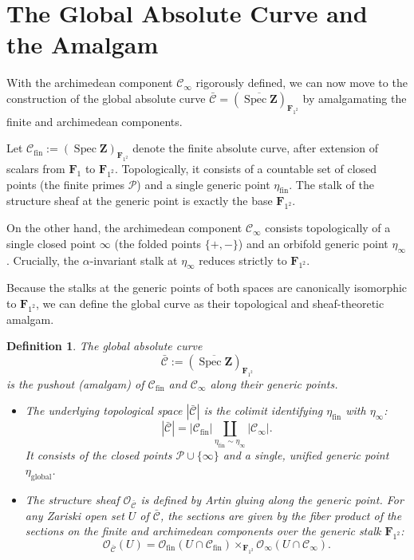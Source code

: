 \documentclass[11pt,a4paper]{article}
\let\mathscr\mathscr
\newtheorem{definition}[theorem]{Definition}
\newcommand{\Z}{\mathbf{Z}}
\newcommand{\Fone}{\mathbf{F}_{1}}
\newcommand{\Ftwo}{\mathbf{F}_{1^2}}
\def\spzb{\overline{\Spec \Z}}
\newcommand{\minf}{\mathscr C_\infty}
\newcommand{\Spec}{\operatorname{Spec}}
\begin{document}
\section{The Global Absolute Curve and the Amalgam}\label{sec:global_curve}

With the archimedean component $\minf$ rigorously defined, we can now move to the construction of the global absolute curve $\bar{\mathscr{C}}=(\spzb)_{\Ftwo}$ by amalgamating the finite and archimedean components.\vspace{.05in} 

Let $\mathscr{C}_{\text{fin}}:=(\Spec \Z)_{\Ftwo}$ denote the finite absolute curve, after extension of scalars from $\Fone$ to $\Ftwo$. Topologically, it consists of a countable set of closed points (the finite primes $\mathcal{P}$) and a single generic point $\eta_{\text{fin}}$. The stalk of the structure sheaf at the generic point is exactly the base $\Ftwo$.

On the other hand, the archimedean component $\minf$ consists topologically of a single closed point $\infty$ (the folded points $\{+, -\}$) and an orbifold generic point $\eta_\infty$. Crucially,  the $\alpha$-invariant stalk at $\eta_\infty$ reduces strictly to $\Ftwo$. \vspace{.03in}

Because the stalks at the generic points of both spaces are canonically isomorphic to $\Ftwo$, we can define the global curve as their topological and sheaf-theoretic amalgam.

\begin{definition}\label{def:absolute_curve0}
The global absolute curve $$\bar{\mathscr{C}}:=(\spzb)_{\Ftwo}$$ is the pushout (amalgam) of $\mathscr{C}_{\text{fin}}$ and $\minf$ along their generic points. 
\begin{itemize}
    \item  The underlying topological space $|\bar{\mathscr{C}}|$ is the colimit identifying $\eta_{\text{fin}}$ with $\eta_\infty$:
    \begin{equation*}
|\bar{\mathscr{C}}| = |\mathscr{C}_{\text{fin}}| \coprod_{\eta_{\text{fin}} \sim \eta_\infty} |\minf|.
\end{equation*}
    It consists of the closed points $\mathcal{P} \cup \{\infty\}$ and a single, unified generic point $\eta_{\text{global}}$.
    
    \item The structure sheaf $\mathcal{O}_{\bar{\mathscr{C}}}$ is defined by Artin gluing along the generic point. For any Zariski open set $U$ of $\bar{\mathscr{C}}$, the sections are given by the fiber product of the sections on the finite and archimedean components over the generic stalk $\Ftwo$:
    \begin{equation*}
\mathcal{O}_{\bar{\mathscr{C}}}(U) = \mathcal{O}_{\text{fin}}(U \cap \mathscr{C}_{\text{fin}}) \times_{\Ftwo} \mathcal{O}_{\infty}(U \cap \minf).
 \end{equation*}
\end{itemize}
\end{definition}
\end{document}
